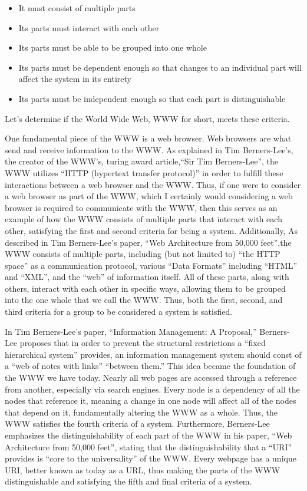 \documentclass[11pt]{article}
\begin{document}
\begin{itemize}
\item It must consist of multiple parts
\item Its parts must interact with each other
\item Its parts must be able to be grouped into one whole
\item Its parts must be dependent enough so that changes to an individual part will affect the system in its entirety
\item Its parts must be independent enough so that each part is distinguishable
\end{itemize}
\par Let’s determine if the World Wide Web, WWW for short, meets these criteria. 
\par One fundamental piece of the WWW is a web browser. Web browsers are what send and receive information to the WWW. As explained in Tim Berners-Lee’s, the creator of the WWW’s, turing award article,``Sir Tim Berners-Lee'', the WWW utilizes ``HTTP (hypertext transfer protocol)'' in order to fulfill these interactions between a web browser and the WWW.\cite{Haigh:2016} Thus, if one were to consider a web browser as part of the WWW, which I certainly would considering a web browser is required to communicate with the WWW, then this serves as an example of how the WWW consists of multiple parts that interact with each other, satisfying the first and second criteria for being a system. Additionally, As described in Tim Berners-Lee’s paper, ``Web Architecture from 50,000 feet'',the WWW consists of multiple parts, including (but not limited to) ``the HTTP space'' as a communication protocol, various ``Data Formats'' including ``HTML'' and ``XML'', and the ``web'' of information itself.\cite{Berners-Lee:1998} All of these parts, along with others, interact with each other in specific ways, allowing them to be grouped into the one whole that we call the WWW. Thus, both the first, second, and third criteria for a group to be considered a system is satisfied.
\par In Tim Berners-Lee’s paper, ``Information Management: A Proposal,'' Berners-Lee proposes that in order to prevent the structural restrictions a ``fixed hierarchical system'' provides, an information management system should const of a ``web of notes with links'' ``between them.''\cite{Berners-Lee:1990} This idea became the foundation of the WWW we have today. Nearly all web pages are accessed through a reference from another, especially via search engines. Every node is a dependency of all the nodes that reference it, meaning a change in one node will affect all of the nodes that depend on it, fundamentally altering the WWW as a whole. Thus, the WWW satisfies the fourth criteria of a system. 
Furthermore, Berners-Lee emphasizes the distinguishability of each part of the WWW in his paper, ``Web Architecture from 50,000 feet'', stating that the distinguishability that a ``URI'' provides is ``core to the universality'' of the WWW.\cite{Berners-Lee:1998} Every webpage has a unique URI, better known as today as a URL, thus making the parts of the WWW distinguishable and satisfying the fifth and final criteria of a system.
\end{document}
